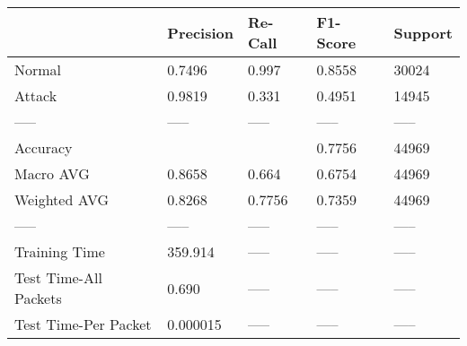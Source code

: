 \begin{tabular}{lllll}
\toprule
{} & Precision & Re-Call & F1-Score & Support \\
\midrule
Normal                &    0.7496 &   0.997 &   0.8558 &   30024 \\
Attack                &    0.9819 &   0.331 &   0.4951 &   14945 \\
-----                 &     ----- &   ----- &    ----- &   ----- \\
Accuracy              &           &         &   0.7756 &   44969 \\
Macro AVG             &    0.8658 &   0.664 &   0.6754 &   44969 \\
Weighted AVG          &    0.8268 &  0.7756 &   0.7359 &   44969 \\
-----                 &     ----- &   ----- &    ----- &   ----- \\
Training Time         &   359.914 &   ----- &    ----- &   ----- \\
Test Time-All Packets &     0.690 &   ----- &    ----- &   ----- \\
Test Time-Per Packet  &  0.000015 &   ----- &    ----- &   ----- \\
\bottomrule
\end{tabular}
